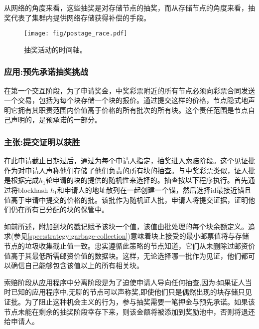 从网络的角度来看，这些抽奖是对存储节点的抽奖，而从存储节点的角度来看，抽奖代表了集群内提供网络存储获得补偿的手段。 


\begin{figure}[htbp]
  \centering
  \texttt{[image: fig/postage\_race.pdf]}
  \caption[事件的时间轴在抽奖轮\statusgreen]{抽奖活动的时间轴。}
  \label{fig:raffle-timeline}
\end{figure}


\subsubsection{应用:预先承诺抽奖挑战}

在第一个交互阶段，为了申请奖金，中奖彩票附近的所有节点必须向彩票合同发送一个交易，包括为每个块存储一个块的报价。通过提交这样的价格，节点隐式地声明它拥有其职责范围内价值高于价格的所有批次的所有块。这个责任范围是节点自己声明的，是预承诺的一部分。 


\subsubsection{主张:提交证明以获胜}

在此申请截止日期过后，通过为每个申请人指定，抽奖进入索赔阶段。这个见证批作为对申请人声称他们存储了他们负责的所有块的抽查。与中奖彩票类似，证人批是根据完成$h_1$轮申请的块的提供的随机性来选择的。抽查按以下程序执行。首先通过将blockhash $h_1$和申请人的地址散列在一起创建一个锚，然后选择id最接近锚且值高于申请中提交的价格的批。该批作为随机证人批，申请人将提交证据，证明他们仍在所有已分配的块的保管中。

如前所述，附加到块的戳记赋予该块一个值，该值由批处理的每个块余额定义。追求(参见\ref{spec:strategy:garbage-collection})意味着块上接受的最小邮票值将与存储节点的垃圾收集截止值一致。忠实遵循此策略的节点知道，它们从未删除过邮资价值高于其最低所需邮资价值的数据块。这样，无论选择哪一批作为见证，他们都可以确信自己能够包含该值以上的所有相关块。

索赔阶段从应用程序中分离阶段是为了迫使申请人导向任何抽查,因为:如果证人当时已知的应用程序中,无聊的节点可以声称奖,即使他们只是偶然出现的块存储只见证批。为了阻止这种机会主义的行为，参与抽奖需要一笔押金与预先承诺。如果该节点未能在剩余的抽奖阶段幸存下来，则该金额将被添加到奖励池中，否则将退还给申请人。

